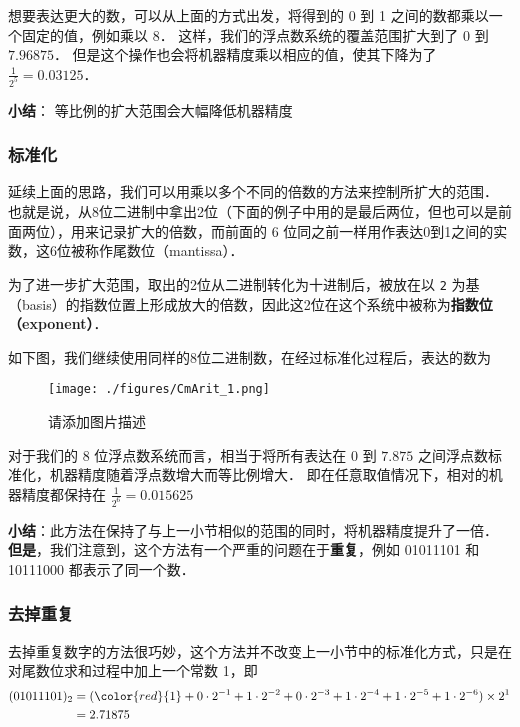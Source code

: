 想要表达更大的数，可以从上面的方式出发，将得到的 0 到 1 之间的数都乘以一个固定的值，例如乘以 8． 这样，我们的浮点数系统的覆盖范围扩大到了 $0$ 到 $7.96875$． 但是这个操作也会将机器精度乘以相应的值，使其下降为了  $\frac{1}{2^5}=0.03125$．

\textbf{小结}： 等比例的扩大范围会大幅降低机器精度

\subsubsection{标准化}

延续上面的思路，我们可以用乘以多个不同的倍数的方法来控制所扩大的范围． 也就是说，从8位二进制中拿出2位（下面的例子中用的是最后两位，但也可以是前面两位），用来记录扩大的倍数，而前面的 6 位同之前一样用作表达0到1之间的实数，这6位被称作尾数位（mantissa）． 

为了进一步扩大范围，取出的2位从二进制转化为十进制后，被放在以 \verb|2| 为基（basis）的指数位置上形成放大的倍数，因此这2位在这个系统中被称为\textbf{指数位（exponent）}．

如下图，我们继续使用同样的8位二进制数，在经过标准化过程后，表达的数为

\begin{figure}[ht]
\centering
\texttt{[image: ./figures/CmArit\_1.png]}
\caption{请添加图片描述} \label{CmArit_fig1}
\end{figure}

对于我们的 8 位浮点数系统而言，相当于将所有表达在 $0$ 到 $7.875$ 之间浮点数标准化，机器精度随着浮点数增大而等比例增大． 即在任意取值情况下，相对的机器精度都保持在 $\frac{1}{2^6}=0.015625$

\textbf{小结}：此方法在保持了与上一小节相似的范围的同时，将机器精度提升了一倍． \textbf{但是}，我们注意到，这个方法有一个严重的问题在于\textbf{重复}，例如 01011101 和 10111000 都表示了同一个数．

\subsubsection{去掉重复}

去掉重复数字的方法很巧妙，这个方法并不改变上一小节中的标准化方式，只是在对尾数位求和过程中加上一个常数 1，即
\begin{equation}
\begin{aligned}
(01011101)_2 &=({\color{red}{1}}+0\cdot2^{-1}+1\cdot2^{-2}+0\cdot2^{-3}+1\cdot2^{-4}+1\cdot2^{-5}+1\cdot2^{-6})\times2^1\\
&= 2.71875
\end{aligned}
\end{equation}

